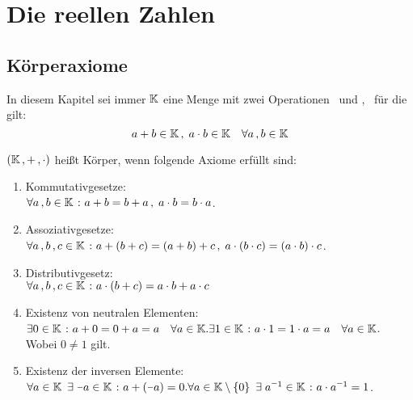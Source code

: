 \documentclass[../ana1.tex]{subfiles}
\begin{document}
\setcounter{section}{2}

\section{Die reellen Zahlen}

\subsection{Körperaxiome}
\begin{prosa}
	In diesem Kapitel sei immer \(\mathbb{K}  \) eine Menge mit zwei Operationen \gqq{\(+  \)} \, und 
	\gqq{\(\cdot \)}, \, für die gilt:
	\[a + b \in \mathbb{K} \operatorname{,}  \; a \cdot b \in \mathbb{K} \quad \forall a \operatorname{,} b \in \mathbb{K}  \]
\end{prosa}

\begin{defi}[Körperaxiome]
	\((\mathbb{K} \operatorname{,} + \operatorname{,} \cdot) \) heißt Körper, wenn folgende Axiome erfüllt sind:
	\begin{enumerate}[label= (K\arabic*)]
		\item\label{ax:K1}Kommutativgesetze: \\
			  \(\forall a \operatorname{,} b \in \mathbb{K}  \; \colon a+b=b+a \operatorname{,}  \; a \cdot b = b \cdot a \).
		\item\label{ax:K2}Assoziativgesetze: \\
			  \(\forall a \operatorname{,} b \operatorname{,} c \in \mathbb{K}  \; \colon a+(b+c) = (a+b)+c \operatorname{,}  \; a \cdot (b \cdot c) = (a \cdot b)\cdot c \).
		\item\label{ax:K3}Distributivgesetz: \\
			  \(\forall a \operatorname{,} b \operatorname{,} c \in \mathbb{K}  \; \colon a \cdot (b+c) = a \cdot b + a \cdot c \)
		\item\label{ax:K4}Existenz von neutralen Elementen: \\
			  \(\exists 0 \in \mathbb{K}  \; \colon a + 0 = 0 + a = a \quad \forall a \in \mathbb{K}. \\
				\exists 1 \in \mathbb{K}  \; \colon a \cdot 1 = 1 \cdot a = a \quad \forall a \in \mathbb{K} \). \\
			  Wobei \(0 \neq 1 \) gilt. 
		\item\label{ax:K5}Existenz der inversen Elemente: \\
		      \(\forall a \in \K \enspace \exists  \; \minus a \in \K  \; \colon a + (\minus a) = 0. \\
			    \forall a \in \K \setminus \set{0} \enspace \exists  \; a^{\minus 1} \in \K  \; \colon a \cdot a^{\minus 1} = 1 \). \\
	\end{enumerate}
\end{defi}
\end{document}
